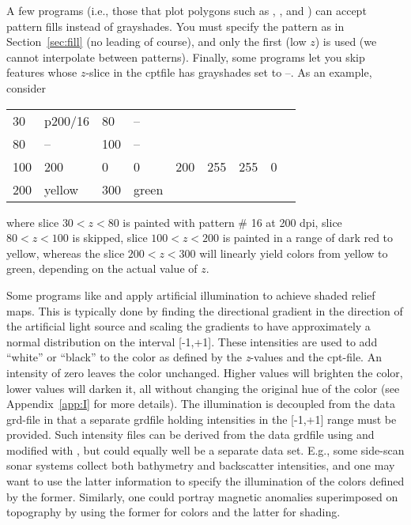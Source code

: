 A few programs (i.e., those that plot polygons such as ,
, and ) can accept pattern fills instead
of grayshades.  You must specify the pattern as in Section~\ref{sec:fill} (no
leading  of course), and only the first (low $z$) is used (we cannot
interpolate between patterns).  
Finally, some programs let you skip features
whose $z$-slice in the cptfile has grayshades set to --.  As an example,
consider

\begin{center}
\begin{tabular}{lllllllll}
30 &  p200/16 &  80 & -- \\ 
80 &  -- &  100 &  -- \\
100 &  200 &  0  &  0  &  200 &  255 &  255  &  0 \\
200 &  yellow &  300 & green  \\ 
\end{tabular} 
\end{center}
\noindent
where slice $30 < z < 80$ is painted with pattern \# 16 at 200 dpi,
slice $80 < z < 100$ is skipped, slice $100 < z < 200$ is
painted in a range of dark red to yellow, whereas the slice $200 < z < 300$
will linearly yield colors from yellow to green, depending on the actual value
of $z$.



Some programs like  and  apply artificial
illumination to achieve shaded relief maps.  This is typically done
by finding the directional gradient in the direction of the artificial
light source and scaling the gradients to have approximately a normal
distribution on the interval [-1,+1].  These intensities are used
to add ``white'' or ``black'' to the color as defined by the \emph{z}-values
and the cpt-file.  An intensity of zero leaves the color unchanged.
Higher values will brighten the color, lower values will darken it,
all without changing the original hue of the color (see Appendix~\ref{app:I}
for more details).  The illumination is decoupled from the data
grd-file in that a separate grdfile holding intensities in the
[-1,+1] range must be provided.  Such intensity files can be
derived from the data grdfile using  and modified
with , but could equally well be a separate data set.
E.g., some side-scan sonar systems collect both bathymetry and
backscatter intensities, and one may want to use the latter information
to specify the illumination of the colors defined by the former.
Similarly, one could portray magnetic anomalies superimposed on
topography by using the former for colors and the latter for shading. 

